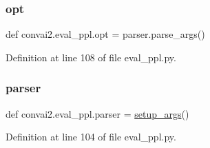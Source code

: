 \mbox{\label{namespaceconvai2_1_1eval__ppl_a34d7661f145bf1fe9770aec4c4e64cc1}} 
\subsubsection{\texorpdfstring{opt}{opt}}
{\footnotesize\ttfamily def convai2.\+eval\+\_\+ppl.\+opt = parser.\+parse\+\_\+args()}



Definition at line 108 of file eval\+\_\+ppl.\+py.

\mbox{\label{namespaceconvai2_1_1eval__ppl_ac28d261be7be5cfc9e48ee440c7c94bd}} 
\subsubsection{\texorpdfstring{parser}{parser}}
{\footnotesize\ttfamily def convai2.\+eval\+\_\+ppl.\+parser = \hyperlink{namespaceconvai2_1_1eval__ppl_a7c5c67a76df91f064ac903d243682416}{setup\+\_\+args}()}



Definition at line 104 of file eval\+\_\+ppl.\+py.

